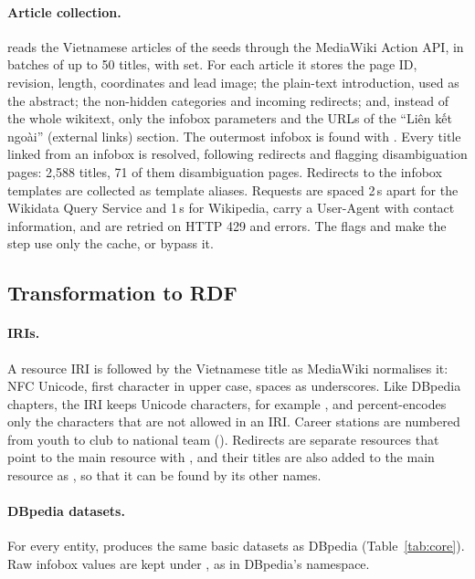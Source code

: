 \paragraph{Article collection.}  reads the Vietnamese articles of
the seeds through the MediaWiki Action API, in batches of up to 50 titles,
with  set. For each article it stores the page ID,
revision, length, coordinates and lead image; the plain-text introduction,
used as the abstract; the non-hidden categories and incoming redirects; and,
instead of the whole wikitext, only the infobox parameters and the URLs of
the ``Liên kết ngoài'' (external links) section. The outermost infobox is found with . Every title
linked from an infobox is resolved, following redirects and flagging
disambiguation pages: 2{,}588 titles, 71 of them disambiguation pages. Redirects
to the infobox templates are collected as template aliases. Requests are
spaced 2\,s apart for the Wikidata Query Service and 1\,s for Wikipedia,
carry a User-Agent with contact information, and are retried on HTTP 429 and
 errors. The flags  and  make the
step use only the cache, or bypass it.

\subsection{Transformation to RDF}
\label{sec:transform}

\paragraph{IRIs.} A resource IRI is  followed by the Vietnamese
title as MediaWiki normalises it: NFC Unicode, first character in upper case,
spaces as underscores. Like DBpedia chapters, the IRI keeps Unicode characters,
for example , and percent-encodes only the
characters that are not allowed in an IRI. Career stations are numbered from
youth to club to national team ().
Redirects are separate resources that point to the main resource with
, and their titles are also added to the main
resource as , so that it can be found by its other names.

\paragraph{DBpedia datasets.} For every entity,  produces the
same basic datasets as DBpedia (Table~\ref{tab:core}). Raw infobox
values are kept under , as in DBpedia's  namespace.

